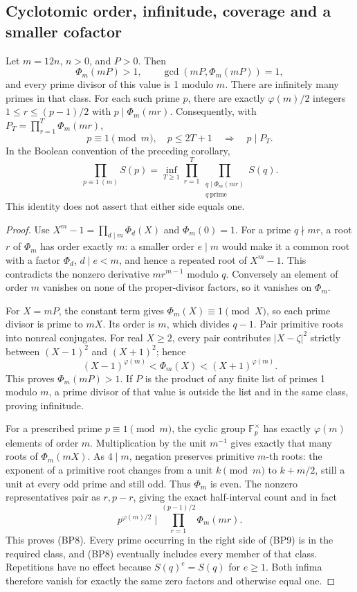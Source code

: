 \subsection{Cyclotomic order, infinitude, coverage and a smaller cofactor}

\begin{theorem}
\label{thm:bp-cyclotomic}
Let \(m=12n\), \(n>0\), and \(P>0\). Then
\[
 \Phi_m(mP)>1,\qquad \gcd(mP,\Phi_m(mP))=1,
\]
and every prime divisor of this value is 1 modulo \(m\).
There are infinitely many primes in that class. For each such prime
\(p\), there are exactly \(\varphi(m)/2\) integers
\(1\le r\le(p-1)/2\) with \(p\mid\Phi_m(mr)\).
Consequently, with \(P_T=\prod_{r=1}^T\Phi_m(mr)\),
\[
 p\equiv1\pmod m,\quad p\le2T+1\quad\Longrightarrow\quad p\mid P_T.
 \tag{BP8}
\]
In the Boolean convention of the preceding corollary,
\[
 \prod_{p\equiv1\ (m)}S(p)
 =\inf_{T\ge1}\prod_{r=1}^T
   \prod_{\substack{q\mid\Phi_m(mr)\\q\ \text{prime}}}S(q).
 \tag{BP9}
\]
This identity does not assert that either side equals one.
\end{theorem}
\begin{proof}
Use \(X^m-1=\prod_{d\mid m}\Phi_d(X)\) and \(\Phi_m(0)=1\).
For a prime \(q\nmid mr\), a root \(r\) of \(\Phi_m\)
has order exactly \(m\): a smaller order \(e\mid m\) would make
it a common root with a factor \(\Phi_d\), \(d\mid e<m\),
and hence a repeated root of \(X^m-1\). This contradicts the
nonzero derivative \(mr^{m-1}\) modulo \(q\). Conversely an
element of order \(m\) vanishes on none of the proper-divisor
factors, so it vanishes on \(\Phi_m\).

For \(X=mP\), the constant term gives \(\Phi_m(X)\equiv1\pmod X\),
so each prime divisor is prime to \(mX\). Its order is \(m\),
which divides \(q-1\). Pair primitive roots into nonreal conjugates.
For real \(X\ge2\), every pair contributes \(|X-\zeta|^2\)
strictly between \((X-1)^2\) and \((X+1)^2\); hence
\[
 (X-1)^{\varphi(m)}<\Phi_m(X)<(X+1)^{\varphi(m)}.
\]
This proves \(\Phi_m(mP)>1\). If \(P\) is the product of any
finite list of primes 1 modulo \(m\), a prime divisor of that value
is outside the list and in the same class, proving infinitude.

For a prescribed prime \(p\equiv1\pmod m\), the cyclic group
\(\mathbb F_p^\times\) has exactly \(\varphi(m)\) elements
of order \(m\). Multiplication by the unit \(m^{-1}\) gives exactly
that many roots of \(\Phi_m(mX)\). As \(4\mid m\), negation
preserves primitive \(m\)-th roots: the exponent of a primitive
root changes from a unit \(k\pmod m\) to \(k+m/2\), still a
unit at every odd prime and still odd. Thus \(\Phi_m\) is even.
The nonzero representatives pair as \(r,p-r\), giving the exact
half-interval count and in fact
\[
 p^{\varphi(m)/2}\mid\prod_{r=1}^{(p-1)/2}\Phi_m(mr).
\]
This proves (BP8). Every prime occurring in the right side of (BP9)
is in the required class, and (BP8) eventually includes every member
of that class. Repetitions have no effect because \(S(q)^e=S(q)\)
for \(e\ge1\). Both infima therefore vanish for exactly the same
zero factors and otherwise equal one.
\end{proof}

